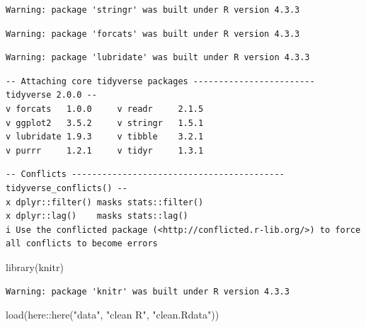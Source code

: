 \documentclass[
  letterpaper,
  DIV=11,
  numbers=noendperiod]{scrartcl}
\newenvironment{Shaded}{\begin{snugshade}}{\end{snugshade}}
\newcommand{\FunctionTok}[1]{\textcolor[rgb]{0.28,0.35,0.67}{#1}}
\newcommand{\NormalTok}[1]{\textcolor[rgb]{0.00,0.23,0.31}{#1}}
\newcommand{\SpecialCharTok}[1]{\textcolor[rgb]{0.37,0.37,0.37}{#1}}
\newcommand{\StringTok}[1]{\textcolor[rgb]{0.13,0.47,0.30}{#1}}
\begin{document}
\begin{verbatim}
Warning: package 'stringr' was built under R version 4.3.3
\end{verbatim}

\begin{verbatim}
Warning: package 'forcats' was built under R version 4.3.3
\end{verbatim}

\begin{verbatim}
Warning: package 'lubridate' was built under R version 4.3.3
\end{verbatim}

\begin{verbatim}
-- Attaching core tidyverse packages ------------------------ tidyverse 2.0.0 --
v forcats   1.0.0     v readr     2.1.5
v ggplot2   3.5.2     v stringr   1.5.1
v lubridate 1.9.3     v tibble    3.2.1
v purrr     1.2.1     v tidyr     1.3.1
\end{verbatim}

\begin{verbatim}
-- Conflicts ------------------------------------------ tidyverse_conflicts() --
x dplyr::filter() masks stats::filter()
x dplyr::lag()    masks stats::lag()
i Use the conflicted package (<http://conflicted.r-lib.org/>) to force all conflicts to become errors
\end{verbatim}

\begin{Shaded}
\begin{Highlighting}[]
\FunctionTok{library}\NormalTok{(knitr)}
\end{Highlighting}
\end{Shaded}

\begin{verbatim}
Warning: package 'knitr' was built under R version 4.3.3
\end{verbatim}

\begin{Shaded}
\begin{Highlighting}[]
\FunctionTok{load}\NormalTok{(here}\SpecialCharTok{::}\FunctionTok{here}\NormalTok{(}\StringTok{"data"}\NormalTok{, }\StringTok{"clean R"}\NormalTok{, }\StringTok{"clean.Rdata"}\NormalTok{))}
\end{Highlighting}
\end{Shaded}
\end{document}

